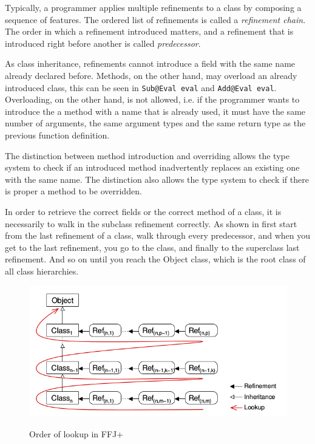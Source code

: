 Typically, a programmer applies multiple refinements to a class by composing
a sequence of features. The ordered list of refinements is called a \emph{refinement
chain}. The order in which a refinement introduced matters, and a refinement
that is introduced right before another is called \emph{predecessor}. 

As class inheritance, refinements cannot introduce a field with the same
name already declared before. Methods, on the other hand, may overload an already
introduced class, this can be seen in \texttt{Sub@Eval eval} and \texttt{Add@Eval eval}.
Overloading, on the other hand, is not allowed, i.e. if the programmer wants to introduce the
a method with a name that is already used, it must have the same number of arguments, the same argument types
and the same return type as the previous function definition.

The distinction between method introduction and overriding allows the type system to check
if an introduced method inadvertently replaces an existing one with the same name.
The distinction also allows the type system to check if there is proper a method to be overridden.

In order to retrieve the correct fields or the correct method of a class, it is
necessarily to walk in the subclass refinement correctly. As shown in 
first start from the last refinement of a class, walk through every predecessor,
and when you get to the last refinement, you go to the class, and finally to the
superclass last refinement. And so on until you reach the Object class, which
is the root class of all class hierarchies.

\begin{figure}[htb]
    \centering
    \includegraphics[scale=0.7]{doc/images/refinement-order}
    \label{fig:refinement-order}
    \caption{Order of lookup in \gls{FFJ+}}
\end{figure} 

